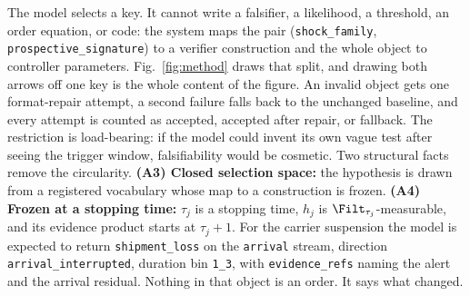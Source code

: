 The model selects a key. It cannot write a falsifier, a likelihood, a threshold,
an order equation, or code: the system maps the pair (\texttt{shock\_family},
\texttt{prospective\_signature}) to a verifier construction and the whole object
to controller parameters. Fig.~\ref{fig:method} draws that split, and drawing
both arrows off one key is the whole content of the figure. An invalid object gets one format-repair attempt, a
second failure falls back to the unchanged baseline, and every attempt is counted
as accepted, accepted after repair, or fallback. The restriction is load-bearing:
if the model could invent its own vague test after seeing the trigger window,
falsifiability would be cosmetic. Two structural facts remove the
circularity. \textbf{(A3) Closed selection space:} the hypothesis is drawn from a
registered vocabulary whose map to a construction is frozen. \textbf{(A4) Frozen
at a stopping time:} $\tau_j$ is a stopping time, $h_j$ is
$\Filt_{\tau_j}$-measurable, and its evidence product starts at $\tau_j + 1$. For
the carrier suspension the model is expected to return \texttt{shipment\_loss} on
the \texttt{arrival} stream, direction \texttt{arrival\_interrupted}, duration bin
\texttt{1\_3}, with \texttt{evidence\_refs} naming the alert and the arrival
residual. Nothing in that object is an order. It says what changed.
